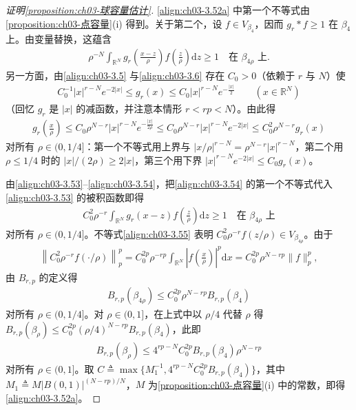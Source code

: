 \documentclass[../../main.tex]{subfiles}%
\begin{document}
\begin{proof}[证明\cref{proposition:ch03-球容量估计}]
\eqref{align:ch03-3.52a} 中第一个不等式由\cref{proposition:ch03-点容量}(i) 得到。关于第二个，设 $f\in V_{\beta_4}$，因而 $g_r*f\geqslant1$ 在 $\beta_4$ 上。由变量替换，这蕴含
\begin{align}
\rho^{-N}\int_{\mathbb{R}^N}g_r\left(\frac{x-z}{\rho}\right)f\left(\frac{z}{\rho}\right)\mathrm{d}z\geqslant1
\quad \text{在 }\beta_{4\rho}\text{ 上}.\label{align:ch03-3.53}
\end{align}
另一方面，由\eqref{align:ch03-3.5} 与\eqref{align:ch03-3.6} 存在 $C_0>0$（依赖于 $r$ 与 $N$）使
\begin{align*}
C_0^{-1}|x|^{r-N}e^{-2|x|}\leqslant g_r(x)\leqslant C_0|x|^{r-N}e^{-\frac{|x|}{2}}\qquad(x\in\mathbb{R}^N)
\end{align*}
（回忆 $g_r$ 是 $|x|$ 的减函数，并注意本情形 $r<rp<N$）。由此得
\begin{align}
g_r\left(\frac{x}{\rho}\right)\leqslant C_0\rho^{N-r}|x|^{r-N}e^{-\frac{|x|}{2\rho}}
\leqslant C_0\rho^{N-r}|x|^{r-N}e^{-2|x|}
\leqslant C_0^2\rho^{N-r}g_r(x)\label{align:ch03-3.54}
\end{align}
对所有 $\rho\in(0,1/4]$：第一个不等式用上界与 $|x/\rho|^{r-N}=\rho^{N-r}|x|^{r-N}$，第二个用 $\rho\leqslant1/4$ 时的 $|x|/(2\rho)\geqslant2|x|$，第三个用下界 $|x|^{r-N}e^{-2|x|}\leqslant C_0g_r(x)$。

由\eqref{align:ch03-3.53}--\eqref{align:ch03-3.54}，把\eqref{align:ch03-3.54} 的第一个不等式代入\eqref{align:ch03-3.53} 的被积函数即得
\begin{align}
C_0^2\rho^{-r}\int_{\mathbb{R}^N}g_r(x-z)f\left(\frac{z}{\rho}\right)\mathrm{d}z\geqslant1
\quad \text{在 }\beta_{4\rho}\text{ 上}\label{align:ch03-3.55}
\end{align}
对所有 $\rho\in(0,1/4]$。不等式\eqref{align:ch03-3.55} 表明 $C_0^2\rho^{-r}f(z/\rho)\in V_{\beta_{4\rho}}$。由于
\begin{align*}
\left\|C_0^2\rho^{-r}f(\cdot/\rho)\right\|_p^p
=C_0^{2p}\rho^{-rp}\int_{\mathbb{R}^N}\left|f\left(\frac{x}{\rho}\right)\right|^p\mathrm{d}x
=C_0^{2p}\rho^{N-rp}\|f\|_p^p,
\end{align*}
由 $B_{r,p}$ 的定义得
\begin{align*}
B_{r,p}(\beta_{4\rho})\leqslant C_0^{2p}\rho^{N-rp}B_{r,p}(\beta_4)
\end{align*}
对所有 $\rho\in(0,1/4]$。对 $\rho\in(0,1]$，在上式中以 $\rho/4$ 代替 $\rho$ 得 $B_{r,p}(\beta_\rho)\leqslant C_0^{2p}(\rho/4)^{N-rp}B_{r,p}(\beta_4)$，此即
\begin{align}
B_{r,p}(\beta_\rho)\leqslant 4^{rp-N}C_0^{2p}B_{r,p}(\beta_4)\rho^{N-rp}\label{align:ch03-3.56}
\end{align}
对所有 $\rho\in(0,1]$。取 $C\triangleq\max\{M_1^{-1},4^{rp-N}C_0^{2p}B_{r,p}(\beta_4)\}$，其中 $M_1\triangleq M|B(0,1)|^{(N-rp)/N}$，$M$ 为\cref{proposition:ch03-点容量}(i) 中的常数，即得\eqref{align:ch03-3.52a}。
\end{proof}
\end{document}
